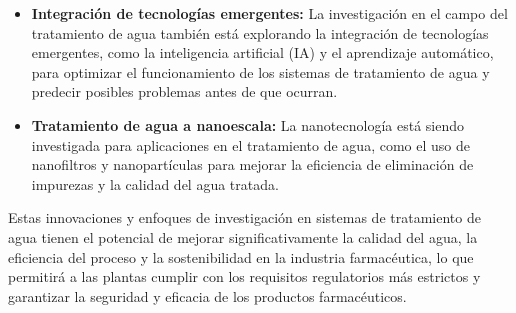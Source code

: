 \begin{itemize}
    \item \textbf{Integración de tecnologías emergentes:} La investigación en el campo del tratamiento de agua también está explorando la integración de tecnologías emergentes, como la inteligencia artificial (IA) y el aprendizaje automático, para optimizar el funcionamiento de los sistemas de tratamiento de agua y predecir posibles problemas antes de que ocurran.

    \item \textbf{Tratamiento de agua a nanoescala:} La nanotecnología está siendo investigada para aplicaciones en el tratamiento de agua, como el uso de nanofiltros y nanopartículas para mejorar la eficiencia de eliminación de impurezas y la calidad del agua tratada.

\end{itemize}

Estas innovaciones y enfoques de investigación en sistemas de tratamiento de agua tienen el potencial de mejorar significativamente la calidad del agua, la eficiencia del proceso y la sostenibilidad en la industria farmacéutica, lo que permitirá a las plantas cumplir con los requisitos regulatorios más estrictos y garantizar la seguridad y eficacia de los productos farmacéuticos.
